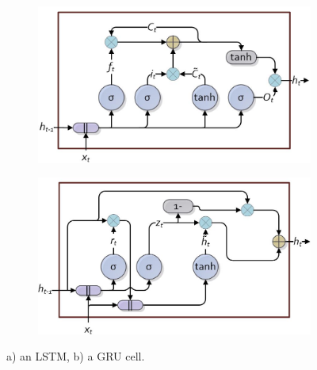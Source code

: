 \documentclass[10pt,twocolumn,letterpaper]{article}
\begin{document}
\begin{figure}[h]
	\begin{center}
		\begin{subfigure}{.45\textwidth}
			\includegraphics[width=\linewidth, height=.2\textheight]{lstm_cell3}
			\caption{}
			\label{fig:lstm_cell} 
		\end{subfigure}
		
		\begin{subfigure}{.45\textwidth}
			\includegraphics[width=\linewidth, height=.2\textheight]{gru_cell3}
			\caption{}
			\label{fig:gru_cell} 
		\end{subfigure}
	\end{center}
	\caption{a) an LSTM, b) a GRU cell.}
	\label{fig:lstm_gru_cells}
\end{figure}
\end{document}
